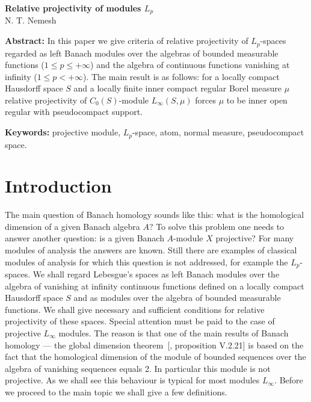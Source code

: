\documentclass[12pt]{article}
\begin{document}
\begin{center}
    \Large \textbf{Relative projectivity of modules $L_p$}\\[0.5cm]
    \small {N. T. Nemesh}\\[0.5cm]
\end{center}

\thispagestyle{empty}

\medskip
\textbf{Abstract:} In this paper we give criteria of relative projectivity of
$L_p$-spaces regarded as left Banach modules over the algebras of bounded
measurable functions ($1\leq p\leq +\infty$) and the algebra of continuous
functions vanishing at infinity ($1\leq p< +\infty$). The main result is as
follows: for a locally compact Hausdorff space $S$ and a locally finite inner
compact regular Borel measure $\mu$ relative projectivity of $C_0(S)$-module
$L_\infty(S,\mu)$ forces $\mu$ to be inner open regular with pseudocompact
support.
\medskip

\textbf{Keywords:} projective module, $L_p$-space, atom, normal measure,
pseudocompact space.

\bigskip


\section{Introduction}\label{SectionIntroduction}

The main question of Banach homology sounds like this: what is the homological
dimension of a given Banach algebra $A$? To solve this problem one needs to
answer another question: is a given Banach $A$-module $X$ projective? For many
modules of analysis the answers are known. Still there are examples of classical
modules of analysis for which this question is not addressed, for example the
$L_p$-spaces. We shall regard Lebesgue's spaces as left Banach modules over the
algebra of vanishing at infinity continuous functions defined on a locally
compact Hausdorff space $S$ and as modules over the algebra of bounded
measurable functions. We shall give necessary and sufficient conditions for
relative projectivity of these spaces. Special attention must be paid to the
case of projective $L_\infty$ modules. The reason is that one of the main
results of Banach homology --- the global dimension
theorem~[\cite{HelHomolBanTopAlg}, proposition V.2.21] is based on the fact that
the homological dimension of the module of bounded sequences over the algebra of
vanishing sequences equals 2. In particular this module is not projective. As we
shall see this behaviour is typical for most modules $L_\infty$. Before we
proceed to the main topic we shall give a few definitions.
\end{document}
